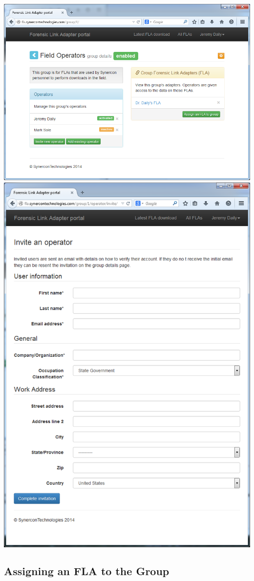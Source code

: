 \documentclass[11pt, oneside]{book}
\begin{document}
\begin{minipage}{0.45\textwidth}
    \includegraphics[width=.8\textwidth]{../media/fla_portal_screenshots/FLAPortalFieldOperatorsScreenShot}\\[\baselineskip]
    \includegraphics[height=1\linewidth]{../media/fla_portal_screenshots/FLAPortalInviteNewOperatorScreenShot}
\end{minipage}


\subsection{Assigning an FLA to the Group}
\end{document}
